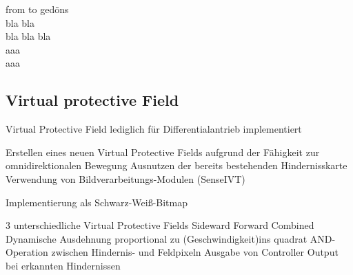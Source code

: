 
\begin{description}
\item[from to gedöns]
\item[bla bla]
\item[bla bla bla]
\item[aaa]
\item[aaa]
\end{description}



\subsection{Virtual protective Field}
\label{sec:vpf}
 
 Virtual Protective Field lediglich für Differentialantrieb implementiert
 
    Erstellen eines neuen Virtual Protective Fields aufgrund der Fähigkeit zur omnidirektionalen Bewegung
        Ausnutzen der bereits bestehenden Hindernisskarte
            Verwendung von Bildverarbeitungs-Modulen (SenseIVT)

Implementierung als Schwarz-Weiß-Bitmap

        3 unterschiedliche Virtual Protective Fields
            Sideward
            Forward
            Combined
        Dynamische Ausdehnung proportional zu (Geschwindigkeit)ins quadrat
        AND-Operation zwischen Hindernis- und Feldpixeln
        Ausgabe von Controller Output bei erkannten Hindernissen
